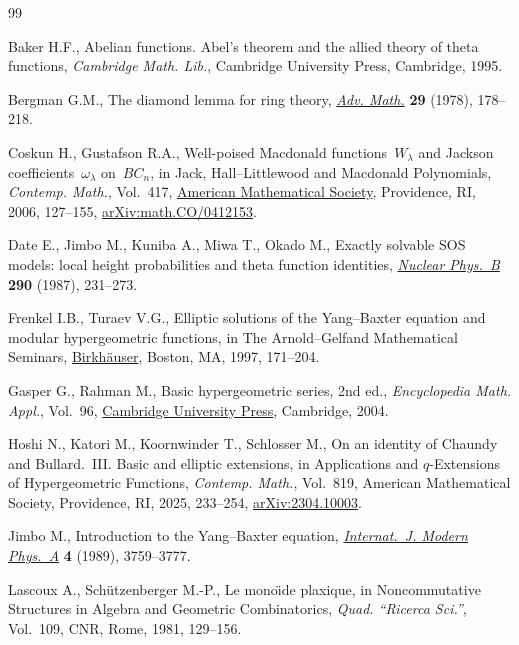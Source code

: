 \documentclass[10pt,a4paper]{amsart}
\numberwithin{equation}{section}
\theoremstyle{definition}
\begin{document}
\begin{thebibliography}{99}
\footnotesize\itemsep=0pt

Baker H.F., Abelian functions. Abel's theorem and the allied theory of theta
 functions, \textit{Cambridge Math. Lib.}, Cambridge University Press, Cambridge, 1995.

Bergman G.M., The diamond lemma for ring theory,
 \href{https://doi.org/10.1016/0001-8708(78)90010-5}{\textit{Adv. Math.}}
 \textbf{29} (1978), 178--218.

Coskun H., Gustafson R.A., Well-poised {M}acdonald functions~{$W_\lambda$} and
 {J}ackson coefficients~{$\omega_\lambda$} on~{$BC_n$}, in Jack,
 {H}all--{L}ittlewood and {M}acdonald {P}olynomials, \textit{Contemp. Math.},
 Vol.~417, \href{https://doi.org/10.1090/conm/417/07919}{American Mathematical
 Society}, Providence, RI, 2006, 127--155,
 \href{http://arxiv.org/abs/math.CO/0412153}{arXiv:math.CO/0412153}.

Date E., Jimbo M., Kuniba A., Miwa T., Okado M., Exactly solvable {SOS} models:
 local height probabilities and theta function identities,
 \href{https://doi.org/10.1016/0550-3213(87)90187-8}{\textit{Nuclear Phys.~B}}
 \textbf{290} (1987), 231--273.

Frenkel I.B., Turaev V.G., Elliptic solutions of the {Y}ang--{B}axter equation
 and modular hypergeometric functions, in The {A}rnold--{G}elfand
 {M}athematical {S}eminars,
 \href{https://doi.org/10.1007/978-1-4612-4122-5_9}{Birkh\"auser}, Boston, MA,
 1997, 171--204.

Gasper G., Rahman M., Basic hypergeometric series, 2nd ed., \textit{Encyclopedia Math.
 Appl.}, Vol.~96,
 \href{https://doi.org/10.1017/CBO9780511526251}{Cambridge University Press}, Cambridge, 2004.

Hoshi N., Katori M., Koornwinder T., Schlosser M., On an identity of {C}haundy
 and {B}ullard.~{III}. Basic and elliptic extensions, in Applications and
 {$q$}-{E}xtensions of {H}ypergeometric {F}unctions, \textit{Contemp. Math.},
 Vol.~819, American Mathematical Society, Providence, RI, 2025, 233--254,
 \href{http://arxiv.org/abs/2304.10003}{arXiv:2304.10003}.

Jimbo M., Introduction to the {Y}ang--{B}axter equation,
 \href{https://doi.org/10.1142/S0217751X89001503}{\textit{Internat.~J. Modern
 Phys.~A}} \textbf{4} (1989), 3759--3777.

Lascoux A., Sch\"utzenberger M.-P., Le mono\"{\i}de plaxique, in Noncommutative
 {S}tructures in {A}lgebra and {G}eometric {C}ombinatorics, \textit{Quad.
 ``Ricerca Sci.''}, Vol.~109, CNR, Rome, 1981, 129--156.


\end{thebibliography}
\end{document}
